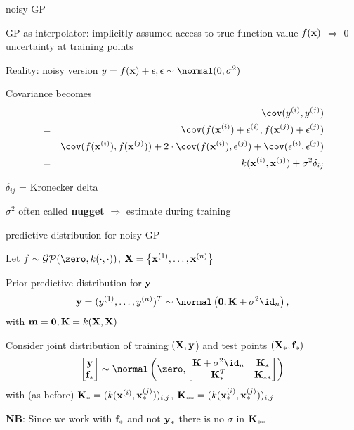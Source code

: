 \documentclass[11pt,compress,t,notes=noshow, xcolor=table]{beamer}
\begin{document}
\begin{framei}[sep=M]{noisy GP}
\item GP as interpolator: implicitly assumed access to true function value $\fx$ $\Rightarrow$ 0 uncertainty at training points
\item Reality: noisy version
$y = \fx + \eps, \eps \sim\normal(0, \sigma^2)$
\item Covariance becomes 
\begin{eqnarray*} 
&&\cov(y^{(i)}, y^{(j)}) \\ &=&  \cov (f(\xi) + \epsilon^{(i)}, f(\xi[j]) + \epsilon^{(j)}) \\
&=& \cov(f(\xi), f(\xi[j])) + 2 \cdot \cov(f(\xi), \epsilon^{(j)}) + \cov(\epsilon^{(i)}, \epsilon^{(j)}) 
\\ &=& \kxij + \sigma^2 \delta_{ij}
\end{eqnarray*}
\item $\delta_{ij}$ = Kronecker delta
\item $\sigma^2$ often called \textbf{nugget} $\Rightarrow$ estimate during training
\end{framei}

\begin{framei}[sep=L]{predictive distribution for noisy GP}
\item Let $f \sim \GPzk$, $\Xmat = \xdat$
\item Prior predictive distribution for $\yv$
$$
\yv = (\yi[1], \dots, \yi[n])^T
\sim \normal\left(\bm{0}, \Kmat + \sigma^2 \id_n \right),
$$
with $\mv = \bm{0}, \Kmat = k(\Xmat, \Xmat)$
\item Consider joint distribution of training $(\Xmat, \yv$) and test points $(\Xmat_*, \fv_*)$
$$
\begin{bmatrix} \yv \\ \fv_* \end{bmatrix} \sim  
\normal\left(\zero, \begin{bmatrix} \Kmat + \sigma^2 \id_n & \Ks \\ \Ks^T & \Kss \end{bmatrix}\right)
$$
with (as before) $\Ks = (k(\xi, \xs^{(j)}))_{i,j}$, $\Kss = (k(\xi[i]_*, \xi[j]_*))_{i,j}$
\item \textbf{NB}: Since we work with $\fv_*$ and not $\yv_*$ there is no $\sigma$ in $\Kss$
\end{framei}
\end{document}
